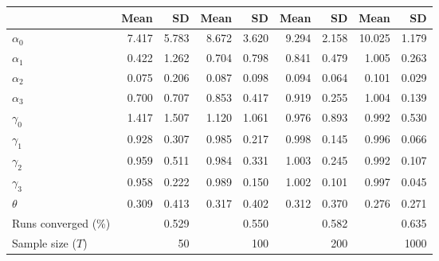 
\begin{tabular}[t]{lrrrrrrrr}
\toprule
  & Mean & SD & Mean  & SD  & Mean   & SD   & Mean    & SD   \\
\midrule
$\alpha_{0}$ & 7.417 & 5.783 & 8.672 & 3.620 & 9.294 & 2.158 & 10.025 & 1.179\\
$\alpha_{1}$ & 0.422 & 1.262 & 0.704 & 0.798 & 0.841 & 0.479 & 1.005 & 0.263\\
$\alpha_{2}$ & 0.075 & 0.206 & 0.087 & 0.098 & 0.094 & 0.064 & 0.101 & 0.029\\
$\alpha_{3}$ & 0.700 & 0.707 & 0.853 & 0.417 & 0.919 & 0.255 & 1.004 & 0.139\\
$\gamma_{0}$ & 1.417 & 1.507 & 1.120 & 1.061 & 0.976 & 0.893 & 0.992 & 0.530\\
$\gamma_{1}$ & 0.928 & 0.307 & 0.985 & 0.217 & 0.998 & 0.145 & 0.996 & 0.066\\
$\gamma_{2}$ & 0.959 & 0.511 & 0.984 & 0.331 & 1.003 & 0.245 & 0.992 & 0.107\\
$\gamma_{3}$ & 0.958 & 0.222 & 0.989 & 0.150 & 1.002 & 0.101 & 0.997 & 0.045\\
$\theta$ & 0.309 & 0.413 & 0.317 & 0.402 & 0.312 & 0.370 & 0.276 & 0.271\\
Runs converged (\%) &  & 0.529 &  & 0.550 &  & 0.582 &  & 0.635\\
Sample size ($T$) &  & 50 &  & 100 &  & 200 &  & 1000\\
\bottomrule
\end{tabular}
